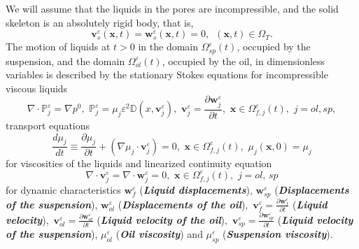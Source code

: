 \documentclass{article}
\theoremstyle{plain}
\theoremstyle{definition}
\numberwithin{equation}{section}
\begin{document}
We will assume that the liquids in the pores are incompressible, and
the solid skeleton is an absolutely rigid body, that is,
\begin{equation}\label{eq1.1}
\boldsymbol{v}^{\varepsilon}_{s}(\boldsymbol{x},t)=\boldsymbol{w}^{\varepsilon}_{s}(\boldsymbol{x},t)=0,
\,\,\,(\boldsymbol{x},t)\in\Omega_{T}.
\end{equation}
The motion of liquids at $t>0$ in the domain $\Omega^{\varepsilon}_{sp}(t)$, occupied by the suspension, and the domain $\Omega^{\varepsilon}_{ol}(t)$, occupied by the oil, in dimensionless variables \cite{14} is described by the stationary Stokes equations for incompressible viscous liquids
\begin{equation}\label{eq1.2}
\nabla\cdot\mathbb{P}^{\varepsilon}_{j}=\nabla{p}^{0},\,\,\mathbb{P}^{\varepsilon}_{j}=
\mu_{j}\varepsilon^{2}\mathbb{D}(x,\boldsymbol{v}^{\varepsilon}_{j}),\,\,
\boldsymbol{v}^{\varepsilon}_{j}=\frac{\partial\boldsymbol{w}^{\varepsilon}_{j}}{\partial t},\,\,
\boldsymbol{x}\in\Omega^{\varepsilon}_{f,j}(t),\,\,j=ol, sp,
\end{equation}
transport equations
\begin{equation}\label{eq1.3}
\frac{d{\mu}_{j}}{dt}\equiv\frac{\partial{\mu}_{j}}{\partial{t}}+
(\nabla\mu_{j}\cdot\boldsymbol{v}^{\varepsilon}_{j})=0,\,\,
\boldsymbol{x}\in\Omega^{\varepsilon}_{f,j}(t),\,\,\mu_{j}(\boldsymbol{x},0)=\mu_{j}
\end{equation}
for viscosities of the liquids and linearized continuity equation
\begin{equation}\label{eq1.4}
\nabla\cdot\boldsymbol{v}^{\varepsilon}_{j}=\nabla\cdot\boldsymbol{w}^{\varepsilon}_{j}=0,\,\,
\boldsymbol{x}\in\Omega^{\varepsilon}_{f,j}(t),\,\,j=ol,\,sp
\end{equation}
for dynamic characteristics $\boldsymbol{w}^{\varepsilon}_{f}$ (\textbf{\emph{Liquid displacements}}),
$\boldsymbol{w}^{\varepsilon}_{sp}$ (\textbf{\emph{Displacements of the suspension}}),
$\boldsymbol{w}^{\varepsilon}_{ol}$ (\textbf{\emph{Displacements of the oil}}),
$\displaystyle\,\boldsymbol{v}^{\varepsilon}_{f}=
\frac{\partial\boldsymbol{w}^{\varepsilon}_{f}}{\partial t}$ (\textbf{\emph{Liquid velocity}}),
$\displaystyle\,\boldsymbol{v}^{\varepsilon}_{ol}=
\frac{\partial\boldsymbol{w}^{\varepsilon}_{ol}}{\partial t}$ (\textbf{\emph{Liquid velocity of the oil}}),
$\displaystyle\,\boldsymbol{v}^{\varepsilon}_{sp}=
\frac{\partial\boldsymbol{w}^{\varepsilon}_{sp}}{\partial t}$ (\textbf{\emph{Liquid velocity of the suspension}}),
${\mu}^{\varepsilon}_{ol}$ (\textbf{\emph{Oil viscosity}}) and ${\mu}^{\varepsilon}_{sp}$ (\textbf{\emph{Suspension viscosity}}).
\end{document}
